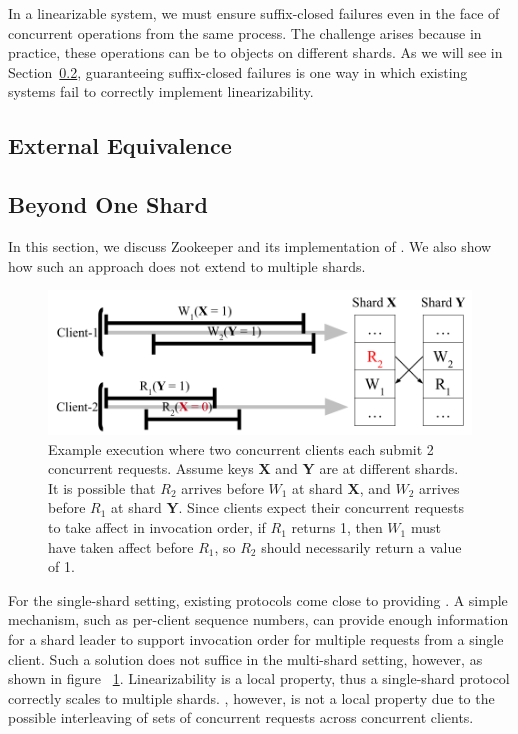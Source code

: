 In a \multidispatch{} linearizable system, we must ensure suffix-closed failures even in the
face of concurrent operations from the same process. The challenge arises because in practice,
these operations can be to objects on different shards. As we will see in
Section~\ref{sec:mdl:zookeeper}, guaranteeing suffix-closed failures is one way in which
existing systems fail to correctly implement \multidispatch{} linearizability.  

\subsection{External Equivalence}
\label{sec:mdl:equivalence}

\subsection{\MDL{} Beyond One Shard}
\label{sec:mdl:zookeeper}

In this section, we discuss Zookeeper and its implementation of \SDL{}.
We also show how such an approach does not extend to multiple shards.

\begin{figure}[!htb]
    \includegraphics[scale=.45]{somet.png}
    \caption{Example execution where two concurrent clients each submit 2 concurrent requests. Assume keys \textbf{X} and \textbf{Y} are at different shards. It is possible that $R_2$ arrives before $W_1$ at shard \textbf{X}, and $W_2$ arrives before $R_1$ at shard \textbf{Y}. Since clients expect their concurrent requests to take affect in invocation order, if $R_1$ returns 1, then $W_1$ must have taken affect before $R_1$, so $R_2$ should necessarily return a value of 1.}
    \label{fig:concurrentbatches}
\end{figure}

For the single-shard setting, existing protocols come close to providing \MDL{}. A simple mechanism, such as per-client sequence numbers, can provide enough information for a shard leader to support invocation order for multiple requests from a single client. Such a solution does not suffice in the multi-shard setting, however, as shown in figure ~\ref{fig:concurrentbatches}. Linearizability is a local property, thus a single-shard protocol correctly scales to multiple shards. \MDL{}, however, is not a local property due to the possible interleaving of sets of concurrent requests across concurrent clients.

